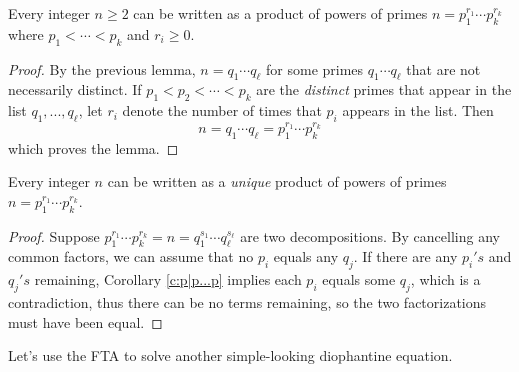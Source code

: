 \documentclass[11pt,dvipsnames]{book}
\numberwithin{equation}{section} %
\numberwithin{figure}{section} %
\numberwithin{table}{section} %
\begin{document}
\begin{lemma}
Every integer $n\geq 2$ can be written as a product of powers of primes $n=p_{1}^{r_{1}}\cdots p_{k}^{r_{k}}$ where $p_{1}<\cdots < p_{k}$ and $r_{i}\geq 0$. 
\end{lemma}

\begin{proof}
By the previous lemma, $n=q_{1}\cdots q_\ell$ for some primes $q_{1}\cdots q_{\ell}$ that are not necessarily distinct. If $p_{1}<p_{2}<\cdots < p_{k}$ are the {\it distinct} primes that appear in the list $q_{1},...,q_{\ell}$, let $r_{i}$ denote the number of times that $p_{i}$ appears in the list. Then
\[
n=q_{1}\cdots q_{\ell} = p_{1}^{r_{1}}\cdots p_{k}^{r_{k}}\]
which proves the lemma.
\end{proof}



\begin{lemma} Every integer $n$ can be written as a {\it unique} product of powers of primes $n=p_1^{r_{1}}\cdots p_k^{r_{k}}$.
\end{lemma}
  
  \begin{proof}
  Suppose $p_1^{r_{1}}\cdots p_k^{r_{k}} = n = q_1^{s_{1}}\cdots q_\ell^{s_{\ell}}$ are two decompositions. By cancelling any common factors, we can assume that no $p_i$ equals any $q_j$. If there are  any $p_i's$ and $q_j's$ remaining,  Corollary \ref{c:p|p...p} implies each $p_{i}$ equals some $q_j$, which is a contradiction, thus there can be no terms remaining, so the two factorizations must have been equal.
  \end{proof}



Let's use the FTA to solve another simple-looking diophantine equation. 
\end{document}
